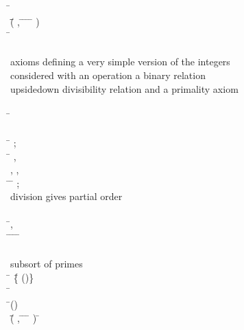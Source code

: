 \begin{hetcasl}
\> \Ax{\bullet} \=\Ax{\forall}  \Ax{:}  \\
\>\> \Ax{\bullet} \=(\=\Ax{\forall} ,  \Ax{:}  \Ax{\bullet} \=   \Ax{\wedge} \=   \Ax{\Rightarrow} \= \Ax{*}   \= \Ax{**} ) \\
\>\>\> \Ax{\Rightarrow} \= \Ax{**}   \\
\\
{\small{}\KW{\%\%} axioms defining a very simple version of the integers\Ax{,}}\\
{\small{}\KW{\%\%} considered with an operation \Ax{*}\Ax{,} a binary relation \Ax{|}\Ax{|}}\\
{\small{}\KW{\%\%} \Ax{(}upside\Ax{-}down divisibility relation\Ax{)} and a primality axiom}\\
\\
\SPEC \= \Ax{=}\\
\> \SORT {}\\
\> \OPS \= \Ax{:} ;\\
\>\> \Ax{\_\_}\Ax{\_\_} \Ax{:} \= \Ax{\times}  \Ax{\rightarrow} , \\
\>\> , ,  \\
\> \PREDS \=\Ax{\_\_}\Ax{||}\Ax{\_\_} \Ax{:} \= \Ax{\times} ;\\
\>\> {\small{}\KW{\%\%} division gives partial order}\\
\>\>  \Ax{:} \\
\> \Ax{\forall} \=,  \Ax{:}  \\
\> \Ax{\bullet} \= \Ax{||}  \Ax{\Leftrightarrow} \=\Ax{\exists}  \Ax{:}  \Ax{\bullet} \= \Ax{=} \=  \\
\> {\small{}\KW{\%}\Ax{\%}}\\
\> {\small{}\KW{\%\%} subsort of primes}\\
\> \SORT \= \Ax{=} \=\{ \Ax{:}  \Ax{\bullet} ()\}\\
\> \Ax{\forall} \= \Ax{:}  \\
\> \Ax{\bullet} \=() \\
\>\> \Ax{\Leftrightarrow} \=(\=\Ax{\forall} ,  \Ax{:}  \Ax{\bullet} \=   \Ax{||}  \Ax{\Rightarrow} \= \Ax{||}  \Ax{\vee} \= \Ax{||} ) \Ax{\wedge} \Ax{\neg} \= \Ax{=} \\

\end{hetcasl}
